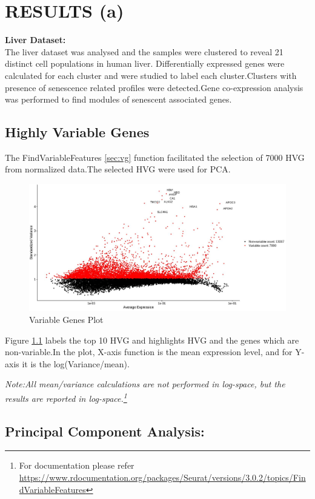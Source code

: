 \documentclass{sydneythesis}
\begin{document}
\chapter{RESULTS (a)}\label{ch:results}

\textbf{Liver Dataset:}\\
The liver dataset was analysed and the samples were clustered to reveal
21 distinct cell populations in human liver. Differentially expressed
genes were calculated for each cluster and were studied to label each
cluster.Clusters with presence of senescence related profiles were
detected.Gene co-expression analysis was performed to find modules of
senescent associated genes.

\section{Highly Variable Genes}\label{sec:hvres}

The FindVariableFeatures \ref{sec:vg} function facilitated the selection
of 7000 HVG from normalized data.The selected HVG were used for PCA.

\begin{figure}[H]
  \includegraphics[scale=0.5]{hvgliver.JPG}
  \caption{Variable Genes Plot}
  \label{fig:fig1}
\end{figure}

Figure \ref{fig:fig1} labels the top 10 HVG and highlights HVG and the
genes which are non-variable.In the plot, X-axis function is the mean
expression level, and for Y-axis it is the log(Variance/mean).

\textit{Note:All mean/variance calculations are not performed in log-space, but the results are reported in log-space.\footnote{For documentation please refer \url{https://www.rdocumentation.org/packages/Seurat/versions/3.0.2/topics/FindVariableFeatures}}}

\section{Principal Component Analysis:}\label{sec:pcares}
\end{document}
